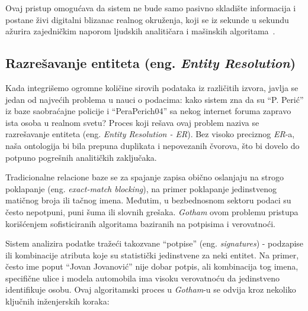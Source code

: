 ﻿\documentclass[12pt]{article}
\begin{document}
Ovaj pristup omogućava da sistem ne bude samo pasivno skladište informacija i postane živi digitalni blizanac realnog okruženja, koji se iz sekunde u sekundu ažurira zajedničkim naporom ljudskih analitičara i mašinskih algoritama~\cite{wei2024brief}.

\subsection{Razrešavanje entiteta (eng. \textit{Entity Resolution})}

Kada integrišemo ogromne količine sirovih podataka iz različitih izvora, javlja se jedan od najvećih problema u nauci o podacima: kako sistem zna da su \enquote{P. Perić} iz baze saobraćajne policije i \enquote{PeraPerich04} sa nekog internet foruma zapravo ista osoba u realnom svetu?
Proces koji rešava ovaj problem naziva se razrešavanje entiteta (eng. \textit{Entity Resolution - ER}).
Bez visoko preciznog \textit{ER}-a, naša ontologija bi bila prepuna duplikata i nepovezanih čvorova, što bi dovelo do potpuno pogrešnih analitičkih zaključaka.

Tradicionalne relacione baze se za spajanje zapisa obično oslanjaju na strogo poklapanje (eng. \textit{exact-match blocking}), na primer poklapanje jedinstvenog matičnog broja ili tačnog imena.
Međutim, u bezbednosnom sektoru podaci su često nepotpuni, puni šuma ili slovnih grešaka.
\textit{Gotham} ovom problemu pristupa korišćenjem sofisticiranih algoritama baziranih na potpisima i verovatnoći.

Sistem analizira podatke tražeći takozvane \enquote{potpise} (eng. \textit{signatures}) - podzapise ili kombinacije atributa koje su statistički jedinstvene za neki entitet.
Na primer, često ime poput \enquote{Jovan Jovanović} nije dobar potpis, ali kombinacija tog imena, specifične ulice i modela automobila ima visoku verovatnoću da jedinstveno identifikuje osobu.
Ovaj algoritamski proces u \textit{Gotham}-u se odvija kroz nekoliko ključnih inženjerskih koraka:
\end{document}
